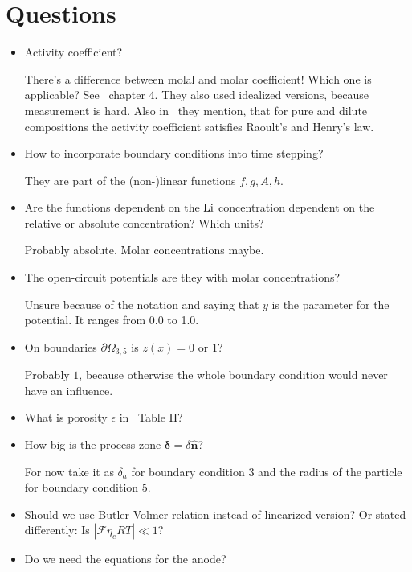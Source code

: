 \documentclass[a4paper,11pt]{scrartcl}
\newcommand*{\Li}{\ce{Li}}
\newcommand*{\F}{\mathcal{F}}
\begin{document}
\section*{Questions}
\begin{itemize}
\item Activity coefficient?

  There's a difference between molal and molar coefficient! Which one is applicable?
  See~\cite{doyle95} chapter 4.
  They also used idealized versions, because measurement is hard.
  Also in~\cite{garcia05} they mention, that for pure and dilute compositions
  the activity coefficient satisfies Raoult's and Henry's law.

\item How to incorporate boundary conditions into time stepping?

  They are part of the (non-)linear functions $f, g, A, h$.

\item Are the functions dependent on the $\Li$ concentration dependent on the
  relative or absolute concentration? Which units?

  Probably absolute. Molar concentrations maybe.

\item The open-circuit potentials are they with molar concentrations?

  Unsure because of the  notation and saying that $y$ is the
  parameter for the potential. It ranges from 0.0 to 1.0.

\item On boundaries $\partial\Omega_{3,5}$ is $z(x) = 0$ or $1$?

  Probably $1$, because otherwise the whole boundary condition would never
  have an influence.

\item What is porosity $\epsilon$ in~\cite{garcia05} Table II?

\item How big is the process zone $\boldsymbol{\delta} = \delta \boldsymbol{\hat{n}}$?

  For now take it as $\delta_a$ for boundary condition 3 and the radius of the
  particle for boundary condition 5.

\item Should we use Butler-Volmer relation instead of linearized version?
  Or stated differently: Is $|\F \eta_e R T| \ll 1$?

\item Do we need the equations for the anode?


\end{itemize}
\end{document}
